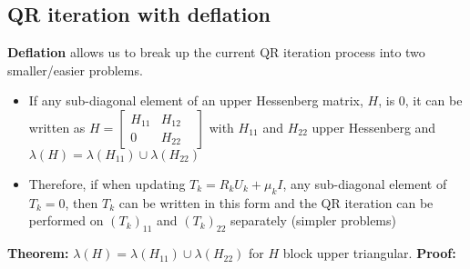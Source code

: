 \documentclass{article}
\begin{document}
\subsection{QR iteration with deflation}
\textbf{Deflation} allows us to break up the current QR iteration process into two smaller/easier problems.
\begin{itemize}
    \item If any sub-diagonal element of an upper Hessenberg matrix, $H$, is 0, it can be written as $H = \begin{bmatrix} H_{11} & H_{12} \\ 0 & H_{22} &\end{bmatrix}$ with $H_{11}$ and $H_{22}$ upper Hessenberg and $\lambda(H) = \lambda(H_{11})\cup \lambda(H_{22})$
    \item Therefore, if when updating $T_k = R_kU_k + \mu_k I$, any sub-diagonal element of $T_k = 0$, then $T_k$ can be written in this form and the QR iteration can be performed on $(T_k)_{11}$ and $(T_k)_{22}$ separately (simpler  problems)
\end{itemize}
\textbf{Theorem:} $\lambda(H) = \lambda(H_{11})\cup \lambda(H_{22})$ for $H$ block upper triangular. \textbf{Proof:}
\end{document}
